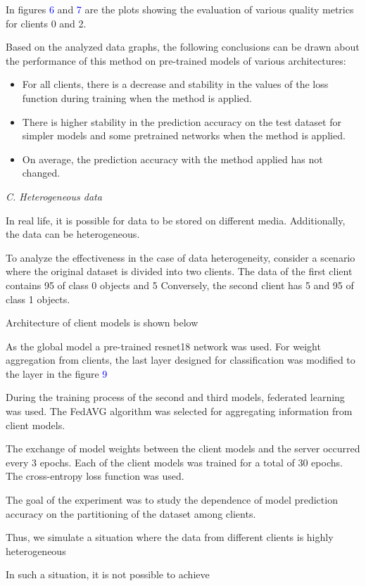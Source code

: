 \documentclass[twotcolumn]{scndocument}
\begin{document}
\begin{multicols}{2}
\par In figures \textcolor{blue}{6} and \textcolor{blue}{7} are the plots showing the evaluation
of various quality metrics for clients 0 and 2.
\par Based on the analyzed data graphs, the following
conclusions can be drawn about the performance of this
method on pre-trained models of various architectures: \begin{itemize} \vspace{-1mm}
\item \vspace{-1mm} For all clients, there is a decrease and stability in
the values of the loss function during training when
the method is applied.
\item There is higher stability in the prediction accuracy
on the test dataset for simpler models and some pretrained networks when the method is applied. 
\item \vspace{-1mm} On average, the prediction accuracy with the method
applied has not changed. \end{itemize} 
\textit{C. Heterogeneous data}
\par In real life, it is possible for data to be stored on different media. Additionally, the data can be heterogeneous.
\par To analyze the effectiveness in the case of data heterogeneity, consider a scenario where the original dataset
is divided into two clients. The data of the first client
contains 95 of class 0 objects and 5%
Conversely, the second client has 5%
and 95 of class 1 objects.
\columnbreak
\par Architecture of client models
is shown below
\par As the global model a pre-trained resnet18 network
was used. For weight aggregation from clients, the last
layer designed for classification was modified to the layer
in the figure \textcolor{blue}{9}
\par During the training process of the second and third
models, federated learning was used. The FedAVG algorithm was selected for aggregating information from
client models.
\par The exchange of model weights between the client
models and the server occurred every 3 epochs. Each
of the client models was trained for a total of 30 epochs.
The cross-entropy loss function was used.
\par The goal of the experiment was to study the dependence of model prediction accuracy on the partitioning
of the dataset among clients.
\par Thus, we simulate a situation where the data from
different clients is highly heterogeneous
\par In such a situation, it is not possible to achieve
\end{multicols}
\end{document}

